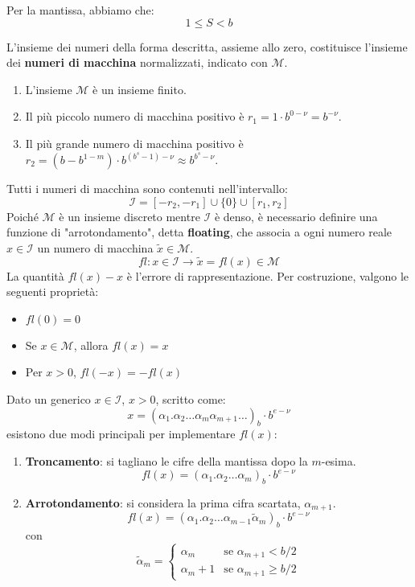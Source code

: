 Per la mantissa, abbiamo che:
$$ 1 \le S < b $$

\begin{definition}
L'insieme dei numeri della forma descritta, assieme allo zero, costituisce l'insieme dei \textbf{numeri di macchina} normalizzati, indicato con $\mathcal{M}$.
\end{definition}

\begin{osservazione}
\begin{enumerate}
    \item L'insieme $\mathcal{M}$ è un insieme finito.
    \item Il più piccolo numero di macchina positivo è $r_1 = 1 \cdot b^{0-\nu} = b^{-\nu}$.
    \item Il più grande numero di macchina positivo è $r_2 = (b - b^{1-m}) \cdot b^{(b^s-1)-\nu} \approx b^{b^s-\nu}$.
\end{enumerate}
\end{osservazione}

Tutti i numeri di macchina sono contenuti nell'intervallo:
$$ \mathcal{I} = [-r_2, -r_1] \cup \{0\} \cup [r_1, r_2] $$
Poiché $\mathcal{M}$ è un insieme discreto mentre $\mathcal{I}$ è denso, è necessario definire una funzione di "arrotondamento", detta \textbf{floating}, che associa a ogni numero reale $x \in \mathcal{I}$ un numero di macchina $\tilde{x} \in \mathcal{M}$.
$$ fl: x \in \mathcal{I} \to \tilde{x} = fl(x) \in \mathcal{M} $$
La quantità $fl(x)-x$ è l'errore di rappresentazione. Per costruzione, valgono le seguenti proprietà:
\begin{itemize}
    \item $fl(0) = 0$
    \item Se $x \in \mathcal{M}$, allora $fl(x) = x$
    \item Per $x>0$, $fl(-x) = -fl(x)$
\end{itemize}

Dato un generico $x \in \mathcal{I}$, $x > 0$, scritto come:
$$ x = (\alpha_1 . \alpha_2 \dots \alpha_m \alpha_{m+1} \dots)_b \cdot b^{e-\nu} $$
esistono due modi principali per implementare $fl(x)$:
\begin{enumerate}
    \item \textbf{Troncamento}: si tagliano le cifre della mantissa dopo la $m$-esima.
    $$ fl(x) = (\alpha_1 . \alpha_2 \dots \alpha_m)_b \cdot b^{e-\nu} $$
    
    \item \textbf{Arrotondamento}: si considera la prima cifra scartata, $\alpha_{m+1}$.
    $$ fl(x) = (\alpha_1 . \alpha_2 \dots \alpha_{m-1} \tilde{\alpha}_m)_b \cdot b^{e-\nu} $$
    con
    \[ \tilde{\alpha}_m = 
    \begin{cases} 
    \alpha_m & \text{se } \alpha_{m+1} < b/2 \\
    \alpha_m + 1 & \text{se } \alpha_{m+1} \ge b/2
    \end{cases}
    \]
\end{enumerate}

